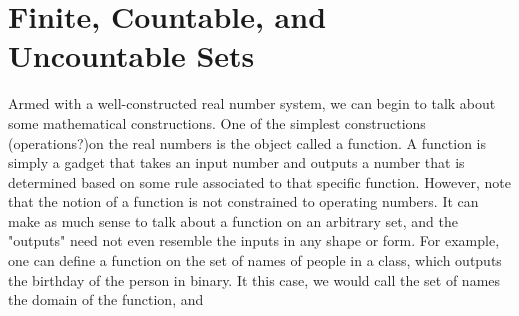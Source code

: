 \section{Finite, Countable, and Uncountable Sets}
	Armed with a well-constructed real number system, we can begin to talk about some mathematical constructions. One of the simplest constructions (operations?)on the real numbers is the object called a function. A function is simply a 
gadget that takes an input number and outputs a number that is determined based 
on some rule associated to that specific function. 
	However, note that the notion of a function is not
constrained to operating numbers. It can make as much sense to talk about a 
function on an arbitrary set, and the "outputs" need not even resemble the 
inputs in any shape or form. For example, one can define a function on the set
of names of people in a class, which outputs the birthday of the person in
binary. 
	It this case, we would call the set of names the domain of the function,
and    
		
